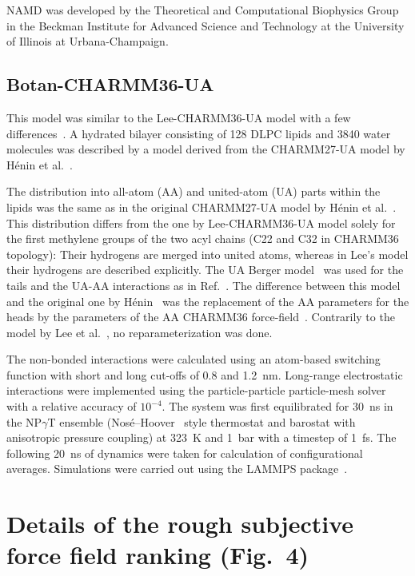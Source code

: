 \documentclass[journal=jacsat,manuscript=article]{achemso}
\begin{document}
NAMD was developed by the Theoretical and Computational Biophysics Group in the
 Beckman Institute for Advanced Science and Technology at the University
 of Illinois at Urbana-Champaign\cite{phillips05}.

\subsection{Botan-CHARMM36-UA}
This model was similar to the Lee-CHARMM36-UA model with a few  differences~\cite{botan15}.
A hydrated bilayer consisting of 128 DLPC lipids and 3840 water
molecules was described by a model derived from the CHARMM27-UA model by H\'enin et al.~\cite{henin08}.

The distribution into all-atom  (AA) and united-atom (UA) parts within the lipids was the same
as in the original CHARMM27-UA model by H\'enin et al.~\cite{henin08}.  
This distribution differs from the one by Lee-CHARMM36-UA model solely
for the first methylene groups of the two acyl chains (C22 and C32 in CHARMM36 topology): 
Their hydrogens are merged into  united atoms, whereas in Lee's model their hydrogens are described explicitly.
The UA Berger model~\cite{berger97} was used for the tails and the UA-AA interactions as in Ref.~. 
The difference between this model and the original one by H\'enin~\cite{henin08} was the replacement of the 
AA parameters for the heads by  the parameters of the AA
 CHARMM36 force-field~\cite{klauda10}. Contrarily to the model by Lee et al.~\cite{lee14}, no reparameterization was done.

The non-bonded interactions were calculated using an atom-based switching function with short and long cut-offs of 0.8 and 1.2~nm. 
Long-range electrostatic interactions were implemented using the particle-particle particle-mesh solver with a relative accuracy of $10^{-4}$. The system 
was first equilibrated for 30~ns in the NP$\gamma$T ensemble (Nos\'{e}--Hoover~\cite{nose84,hoover85} style thermostat and barostat with anisotropic pressure coupling) 
at 323~K and 1~bar with a timestep of 1~fs. The following 20~ns of dynamics were taken for calculation of configurational averages. 
Simulations were carried out using the LAMMPS package~\cite{plimpton95}. %

\pagebreak
\section{Details of the rough subjective force field ranking (Fig.~4)} 
\end{document}
